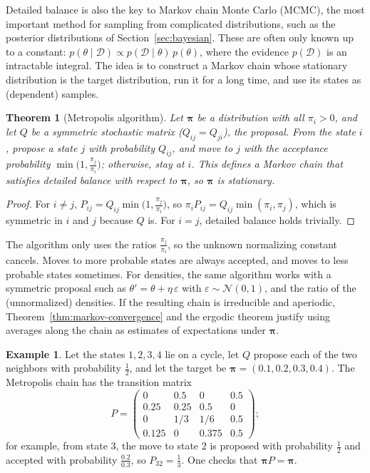 \documentclass[11pt]{article}
\theoremstyle{definition}
\newtheorem{example}[definition]{Example}
\theoremstyle{plain}
\newtheorem{theorem}[definition]{Theorem}
\theoremstyle{remark}
\begin{document}
Detailed balance is also the key to Markov chain Monte Carlo (MCMC), the most important method for sampling from complicated distributions, such as the posterior distributions of Section~\ref{sec:bayesian}. These are often only known up to a constant: $p(\theta \mid \mathcal{D}) \propto p(\mathcal{D} \mid \theta)\,p(\theta)$, where the evidence $p(\mathcal{D})$ is an intractable integral. The idea is to construct a Markov chain whose stationary distribution is the target distribution, run it for a long time, and use its states as (dependent) samples.

\begin{theorem}[Metropolis algorithm]\label{thm:metropolis}
    Let $\boldsymbol{\pi}$ be a distribution with all $\pi_i > 0$, and let $Q$ be a symmetric stochastic matrix ($Q_{ij} = Q_{ji}$), the proposal. From the state $i$, propose a state $j$ with probability $Q_{ij}$, and move to $j$ with the acceptance probability $\min\big(1, \frac{\pi_j}{\pi_i}\big)$; otherwise, stay at $i$. This defines a Markov chain that satisfies detailed balance with respect to $\boldsymbol{\pi}$, so $\boldsymbol{\pi}$ is stationary.
\end{theorem}

\begin{proof}
    For $i \neq j$, $P_{ij} = Q_{ij}\min\big(1, \frac{\pi_j}{\pi_i}\big)$, so $\pi_i P_{ij} = Q_{ij}\min(\pi_i, \pi_j)$, which is symmetric in $i$ and $j$ because $Q$ is. For $i = j$, detailed balance holds trivially.
\end{proof}

The algorithm only uses the ratios $\frac{\pi_j}{\pi_i}$, so the unknown normalizing constant cancels. Moves to more probable states are always accepted, and moves to less probable states sometimes. For densities, the same algorithm works with a symmetric proposal such as $\theta' = \theta + \eta\,\varepsilon$ with $\varepsilon \sim \mathcal{N}(0, 1)$, and the ratio of the (unnormalized) densities. If the resulting chain is irreducible and aperiodic, Theorem~\ref{thm:markov-convergence} and the ergodic theorem justify using averages along the chain as estimates of expectations under $\boldsymbol{\pi}$.

\begin{example}\label{ex:metropolis}
    Let the states $1, 2, 3, 4$ lie on a cycle, let $Q$ propose each of the two neighbors with probability $\frac{1}{2}$, and let the target be $\boldsymbol{\pi} = (0.1, 0.2, 0.3, 0.4)$. The Metropolis chain has the transition matrix
    \[P = \begin{pmatrix} 0 & 0.5 & 0 & 0.5 \\ 0.25 & 0.25 & 0.5 & 0 \\ 0 & 1/3 & 1/6 & 0.5 \\ 0.125 & 0 & 0.375 & 0.5 \end{pmatrix};\]
    for example, from state $3$, the move to state $2$ is proposed with probability $\frac{1}{2}$ and accepted with probability $\frac{0.2}{0.3}$, so $P_{32} = \frac{1}{3}$. One checks that $\boldsymbol{\pi}P = \boldsymbol{\pi}$.
\end{example}
\end{document}
